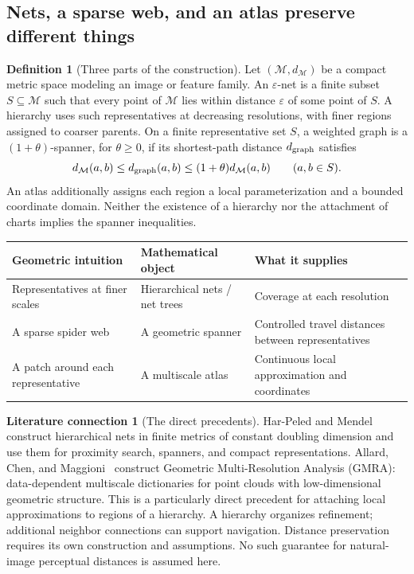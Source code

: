 \documentclass[11pt,a4paper]{article}
\theoremstyle{definition}
\theoremstyle{definition}
\newtheorem{definition}[theorem]{Definition}
\newtheorem{literature}[theorem]{Literature connection}
\theoremstyle{remark}\newtheorem{remark}[theorem]{Remark}
\begin{document}
\subsection{Nets, a sparse web, and an atlas preserve different things}

\begin{definition}[Three parts of the construction]\label{def:multiscaleobjects}
Let $(\mathcal M,d_{\mathcal M})$ be a compact metric space modeling an image or feature family. An $\varepsilon$-net is a finite subset $S\subseteq\mathcal M$ such that every point of $\mathcal M$ lies within distance $\varepsilon$ of some point of $S$. A hierarchy uses such representatives at decreasing resolutions, with finer regions assigned to coarser parents. On a finite representative set $S$, a weighted graph is a $(1+\theta)$-spanner, for $\theta\ge0$, if its shortest-path distance $d_{\rm graph}$ satisfies
\[
d_{\mathcal M}(a,b)\le d_{\rm graph}(a,b)
\le(1+\theta)d_{\mathcal M}(a,b)\qquad(a,b\in S).
\]
An atlas additionally assigns each region a local parameterization and a bounded coordinate domain. Neither the existence of a hierarchy nor the attachment of charts implies the spanner inequalities.
\end{definition}

\begin{center}
\small
\begin{tabular}{@{}Y{.27\textwidth}Y{.25\textwidth}Y{.38\textwidth}@{}}
\toprule
Geometric intuition & Mathematical object & What it supplies\\
\midrule
Representatives at finer scales & Hierarchical nets / net trees & Coverage at each resolution\\[4pt]
A sparse spider web & A geometric spanner & Controlled travel distances between representatives\\[4pt]
A patch around each representative & A multiscale atlas & Continuous local approximation and coordinates\\
\bottomrule
\end{tabular}
\end{center}

\begin{literature}[The direct precedents]\label{lit:gmra}
Har-Peled and Mendel~\cite{nettree} construct hierarchical nets in finite metrics of constant doubling dimension and use them for proximity search, spanners, and compact representations. Allard, Chen, and Maggioni~\cite{gmra} construct Geometric Multi-Resolution Analysis (GMRA): data-dependent multiscale dictionaries for point clouds with low-dimensional geometric structure. This is a particularly direct precedent for attaching local approximations to regions of a hierarchy. A hierarchy organizes refinement; additional neighbor connections can support navigation. Distance preservation requires its own construction and assumptions. No such guarantee for natural-image perceptual distances is assumed here.
\end{literature}
\end{document}
